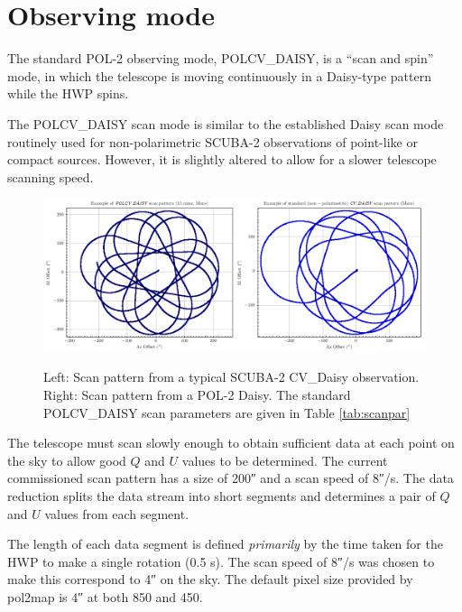 \section{Observing mode}
\label{sec:mmodes}

The standard POL-2 observing mode, POLCV\_DAISY, is a “scan and spin”
mode, in which the telescope is moving continuously in a Daisy-type
pattern while the HWP spins.

The POLCV\_DAISY scan mode is similar to the established Daisy scan
mode routinely used for non-polarimetric SCUBA-2 observations of
point-like or compact sources. However, it is slightly altered to allow
for a slower telescope scanning speed.


\begin{figure}[t!]
\begin{center}
\includegraphics[width=0.9\linewidth]{scan_pattern_daisy_comparison.png}
\label{fig:scancompsrison}
\caption [Scan Pattern Comparison]{Left: Scan pattern from a typical
  SCUBA-2 CV\_Daisy observation. Right: Scan pattern from a POL-2
  Daisy. The standard POLCV\_DAISY scan parameters are given in Table
  \ref{tab:scanpar} }
\end{center}
\end{figure}


The telescope must scan slowly enough to obtain sufficient data at
each point on the sky to allow good $Q$ and $U$ values to be
determined. The current commissioned scan pattern has a size of
200\si{\arcsecond} and a scan speed of 8\si{\arcsecond}/s. The data
reduction splits the data stream into short segments and determines a
pair of $Q$ and $U$ values from each segment.

The length of each data segment is defined \textit{primarily} by the time taken for
the HWP to make a single rotation (0.5 s). The scan speed of
8\si{\arcsecond}/s was chosen to make this correspond to 4\si{\arcsecond}
on the sky. The default pixel size provided by pol2map is 4\si{\arcsecond}
at both 850 and 450.

